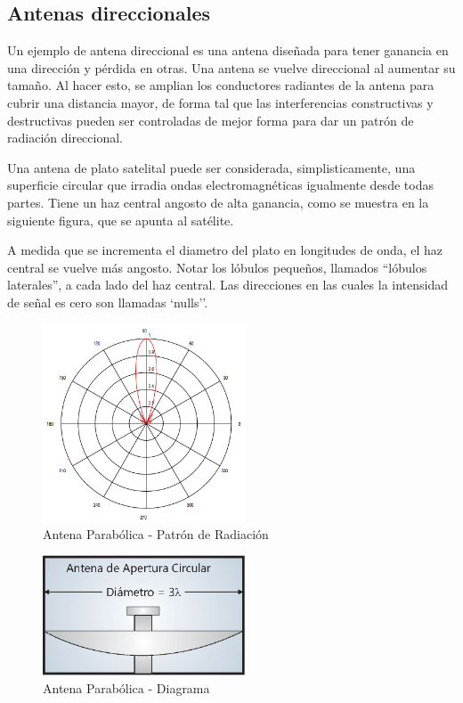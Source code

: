 \subsection{Antenas direccionales}

Un ejemplo de antena direccional es una antena diseñada para tener ganancia en una dirección y pérdida en otras. Una antena se vuelve direccional al aumentar su tamaño. Al hacer esto, se amplian los conductores radiantes de la antena para cubrir una distancia mayor, de forma tal que las interferencias constructivas y destructivas pueden ser controladas de mejor forma para dar un patrón de radiación direccional.

Una antena de plato satelital puede ser considerada, simplisticamente, una superficie circular que irradia ondas electromagnéticas igualmente desde todas partes. Tiene un haz central angosto de alta ganancia, como se muestra en la siguiente figura, que se apunta al satélite.

A medida que se incrementa el diametro del plato en longitudes de onda, el haz central se vuelve más angosto. Notar los lóbulos pequeños, llamados ``lóbulos laterales'', a cada lado del haz central. Las direcciones en las cuales la intensidad de señal es cero son llamadas `nulls''.

\begin{figure}[htb!]
        \centering
        \includegraphics[width=6cm]{./figures/C02-dish_antenna}
        \caption{Antena Parabólica - Patrón de Radiación}
        \label{fig:dish_antenna}
\end{figure}

\begin{figure}[htb!]
        \centering
        \includegraphics[width=6cm]{./figures/C02-dish_antenna_2}
        \caption{Antena Parabólica - Diagrama}
        \label{fig:dish_antenna_2}
\end{figure}

